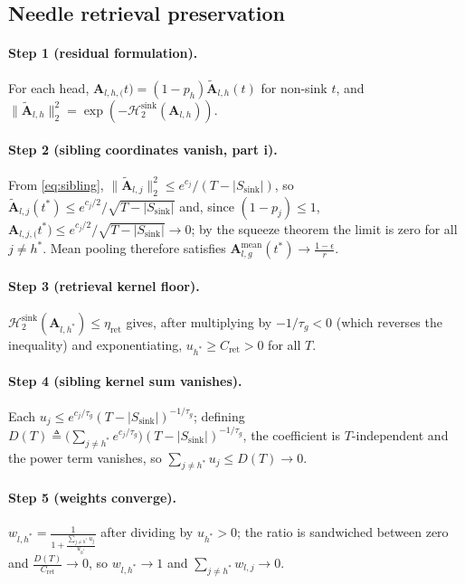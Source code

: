 \documentclass[final,5p,times,twocolumn]{elsarticle}
\theoremstyle{definition}
\theoremstyle{remark}
\newcommand{\Attn}[2]{\mathbf{A}_{#1,#2}}
\newcommand{\AttnMean}[2]{\mathbf{A}^{\mathrm{mean}}_{#1,#2}}
\newcommand{\CollisionSink}[1]{\mathcal{H}^{\mathrm{sink}}_{2}\!\left(#1\right)}
\newcommand{\Ssink}{S_{\mathrm{sink}}}
\begin{document}
\subsection{Needle retrieval preservation}
\label{app:needle}

\paragraph{Step 1 (residual formulation).}
For each head, $\Attn{l,h}(t) = (1-p_h)\tilde{\mathbf{A}}_{l,h}(t)$ for non-sink $t$, and
 $\|\tilde{\mathbf{A}}_{l,h}\|_2^2 = \exp(-\CollisionSink{\Attn{l}{h}})$.

\paragraph{Step 2 (sibling coordinates vanish, part i).}
From \cref{eq:sibling},
 $\|\tilde{\mathbf{A}}_{l,j}\|_2^2 \le e^{c_j}/(T-|\Ssink|)$, so
 $\tilde{\mathbf{A}}_{l,j}(t^{*}) \le e^{c_j/2}/\sqrt{T-|\Ssink|}$ and,
since $(1-p_j) \le 1$,
 $\Attn{l,j}(t^{*}) \le e^{c_j/2}/\sqrt{T-|\Ssink|} \to 0$; by the
squeeze theorem the limit is zero for all $j \neq h^{*}$. Mean pooling
therefore satisfies $\AttnMean{l}{g}(t^{*}) \to \frac{1-\epsilon}{r}$.

\paragraph{Step 3 (retrieval kernel floor).}
 $\CollisionSink{\Attn{l}{h^{*}}} \le \eta_{\mathrm{ret}}$ gives, after
multiplying by $-1/\tau_g < 0$ (which reverses the inequality) and
exponentiating, $u_{h^{*}} \ge C_{\mathrm{ret}} > 0$ for all $T$.

\paragraph{Step 4 (sibling kernel sum vanishes).}
Each $u_j \le e^{c_j/\tau_g}(T-|\Ssink|)^{-1/\tau_g}$; defining
 $D(T) \triangleq \bigl(\sum_{j\neq h^{*}} e^{c_j/\tau_g}\bigr)
(T-|\Ssink|)^{-1/\tau_g}$, the coefficient is $T$-independent and the
power term vanishes, so $\sum_{j\neq h^{*}} u_j \le D(T) \to 0$.

\paragraph{Step 5 (weights converge).}
 $w_{l,h^{*}} = \frac{1}{1 + \frac{\sum_{j\neq h^{*}}u_j}{u_{h^{*}}}}$ after dividing by $u_{h^{*}} > 0$; the ratio is sandwiched between
zero and $\frac{D(T)}{C_{\mathrm{ret}}} \to 0$, so
 $w_{l,h^{*}} \to 1$ and $\sum_{j\neq h^{*}} w_{l,j} \to 0$.
\end{document}
